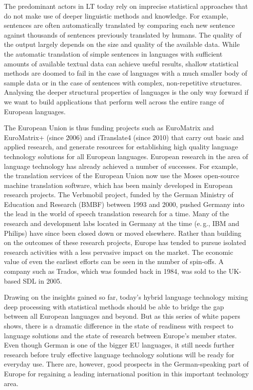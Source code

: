 \documentclass[]{../../metanetpaper}
\begin{document}
\begin{multicols}{2}
The predominant actors in LT today rely on imprecise statistical approaches that do not make use of deeper linguistic methods and knowledge. For example, sentences are often automatically translated by comparing each new sentence against thousands of sentences previously translated by humans. The quality of the output largely depends on the size and quality of the available  data. While the automatic translation of simple sentences in languages with sufficient amounts of available textual data can achieve useful results, shallow statistical methods are doomed to fail in the case of languages with a much smaller body of sample data or in the case of sentences with complex, non-repetitive structures. Analysing the deeper structural properties of languages is the only way forward if we want to build applications that perform well across the entire range of European languages.


The European Union is thus funding projects such as EuroMatrix and EuroMatrix+ (since 2006) and iTranslate4 (since 2010) that carry out basic and applied research, and generate resources for establishing high quality language technology solutions for all European languages. 
European research in the area of language technology has already achieved a number of successes. For example, the translation services of the European Union now use the Moses open-source machine translation software, which has been mainly developed in European research projects. The Verbmobil project, funded by the German Ministry of Education and Research (BMBF) between 1993 and 2000, pushed Germany into the lead in the world of speech translation research for a time. Many of the research and development labs located in Germany at the time (e.\,g., IBM and Philips) have since been closed down or moved elsewhere. Rather than building on the outcomes of these research projects, Europe has tended to pursue isolated research activities with a less pervasive impact on the market. The economic value of even the earliest efforts can be seen in the number of spin-offs. A company such as Trados, which was founded back in 1984, was sold to the UK-based SDL in 2005.


Drawing on the insights gained so far, today’s hybrid language technology mixing deep processing with statistical methods should be able to bridge the gap between all European languages and beyond. But as this series of white papers shows, there is a dramatic difference in the state of readiness with respect to language solutions and the state of research between Europe’s member states. Even though German is one of the bigger EU languages, it still needs further research before truly effective language technology solutions will be ready for everyday use. There are, however, good prospects in the German-speaking part of Europe for regaining a leading international position in this important technology area. 


\end{multicols}
\end{document}
